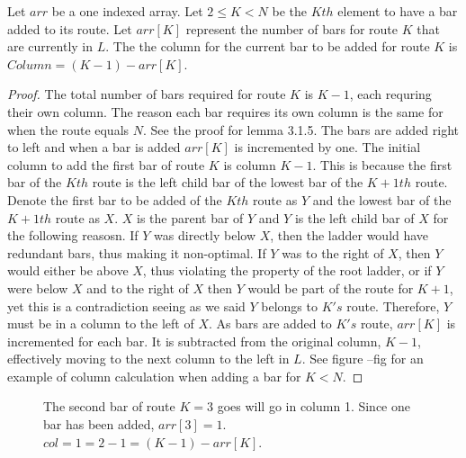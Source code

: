 \begin{lemma}
  Let $arr$ be a one indexed array. Let $2 \leq K < N$ be the $Kth$ element to have a bar added to its route. 
  Let $arr[K]$ represent the number of bars for route $K$ that are currently in $L$. 
  The the column for the current bar to be added for route $K$ is $Column=(K-1)-arr[K]$.
\end{lemma}
\begin{proof}
  The total number of bars required for route $K$ is $K-1$, each requring their own column. The reason each 
  bar requires its own column is the same for when the route equals $N$. See the proof for lemma 3.1.5. The 
  bars are added right to left and when a bar is added $arr[K]$ is incremented by one. The initial column to add the first bar 
  of route $K$ is column $K-1$. This is because the first bar of the $Kth$ route is the left child bar of the 
  lowest bar of the $K+1th$ route. Denote the first bar to be added of the $Kth$ route as $Y$ and the 
  lowest bar of the $K+1th$ route as $X$. $X$ is the parent bar of $Y$ and $Y$ is the left child bar of 
  $X$ for the following reasosn. If $Y$ was directly below $X$, then the ladder would have redundant bars, thus making it 
  non-optimal. If $Y$ was to the right of $X$, then $Y$ would either be above $X$, thus violating the property of the root ladder, 
  or if $Y$ were below $X$ and to the right of $X$ then $Y$ would be part of the route for $K+1$, yet this is a contradiction 
  seeing as we said $Y$ belongs to $K's$ route. Therefore, $Y$ must be in a column to the left of $X$. As bars are added 
  to $K's$ route, $arr[K]$ is incremented for each bar. It is subtracted from the original column, $K-1$, effectively moving 
  to the next column to the left in $L$. See figure --fig for an example of column calculation when adding a bar for $K<N$.
\end{proof}
\begin{figure}[!htp]
  \begin{center}
    
\end{center} 
\caption{The second bar of route $K=3$ goes will go in column 1. Since one bar has been added, $arr[3]=1$. $col=1=2-1=(K-1)-arr[K]$.}
\end{figure}

